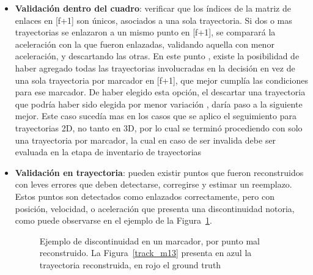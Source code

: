 \begin{itemize}
\item \textbf{Validación dentro del cuadro}: verificar que los índices de la matriz de enlaces en [f+1] son únicos, asociados a una sola trayectoria. Si dos o mas trayectorias se enlazaron a un mismo punto en [f+1], se comparará la aceleración con la que fueron enlazadas, validando aquella con menor aceleración, y descartando las otras. En este punto , existe la posibilidad de haber agregado todas las trayectorias involucradas en la decisión en vez de una sola trayectoria por marcador en [f+1], que mejor cumplía las condiciones para ese marcador. De haber elegido esta opción, el descartar una trayectoria que podría haber sido elegida por menor variación , daría paso a la siguiente mejor. Este caso sucedía mas en los casos que se aplico el seguimiento para trayectorias 2D, no tanto en 3D, por lo cual se terminó procediendo con solo una trayectoria por marcador, la cual en caso de ser invalida debe ser evaluada en la etapa de inventario de trayectorias  
\item \textbf{Validación en trayectoria}: pueden existir puntos que fueron reconstruidos con leves errores que deben detectarse, corregirse y estimar un reemplazo. Estos puntos son detectados como enlazados correctamente, pero con posición, velocidad, o aceleración que presenta una discontinuidad notoria, como puede observarse en el ejemplo de la Figura~\ref{discontinuidad_tracking}.

\begin{figure}[H]
 \centering
 \caption{Ejemplo de discontinuidad en un marcador, por punto mal reconstruido. La Figura~\ref{track_m13} presenta en azul la trayectoria reconstruida, en rojo el ground truth}
 \label{discontinuidad_tracking}
\end{figure}


\end{itemize}
